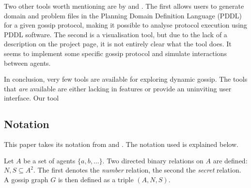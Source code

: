 Two other tools worth mentioning are by \textcite{maffre_faustinemaffregossipproblem-pddl-generator_2020} and \textcite{moelker_rrmoelkergossip-visualization_2016}.
The first allows users to generate domain and problem files in the Planning Domain Definition Language (PDDL) for a given gossip protocol, making it possible to analyse protocol execution using PDDL software.
The second is a visualisation tool, but due to the lack of a description on the project page, it is not entirely clear what the tool does. It seems to implement some specific gossip protocol and simulate interactions between agents.

In conclusion, very few tools are available for exploring dynamic gossip.
The tools that \emph{are} available are either lacking in features or provide an uninviting user interface.
Our tool 

\subsection{Notation}
\label{sec:notation}

This paper takes its notation from \Textcite{van_ditmarsch_dynamic_2018} and \Textcite{van_ditmarsch_strengthening_2019}.
The notation used is explained below.

\begin{definition}
    Let \(A\) be a set of agents \(\{a, b, \dots\}\).
    Two directed binary relations on \(A\) are defined: \(N, S \subseteq A^2\).
    The first denotes the \textit{number} relation, the second the \textit{secret} relation.
    A gossip graph \(G\) is then defined as a triple \((A, N, S)\).
\end{definition}

